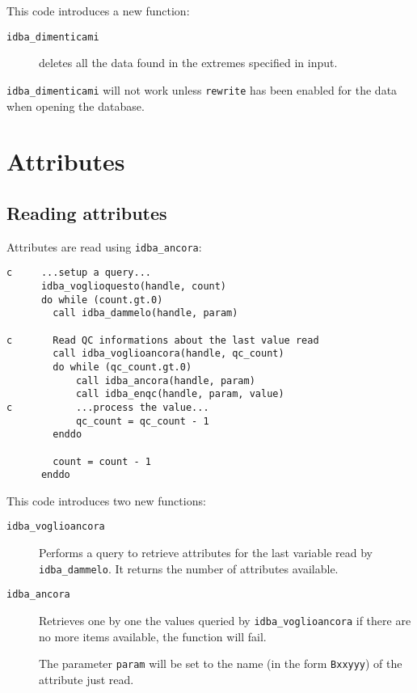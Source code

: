 \documentclass[final,12pt,a4paper,twoside]{book}
\begin{document}
This code introduces a new function:

\begin{description}
\item[{\tt idba\_dimenticami}]
  deletes all the data found in the extremes specified in input.
\end{description}

{\tt idba\_dimenticami} will not work unless {\tt rewrite} has been enabled for
the data when opening the database.

\section {Attributes}

\subsection{Reading attributes}

Attributes are read using {\tt idba\_ancora}:
\label{fun-idba_voglioancora}
\label{fun-idba_ancora}

\begin{verbatim}
c     ...setup a query...
      idba_voglioquesto(handle, count)
      do while (count.gt.0)
        call idba_dammelo(handle, param)

c       Read QC informations about the last value read
        call idba_voglioancora(handle, qc_count)
        do while (qc_count.gt.0)
            call idba_ancora(handle, param) 
            call idba_enqc(handle, param, value)
c           ...process the value...
            qc_count = qc_count - 1
        enddo

        count = count - 1
      enddo
\end{verbatim}

This code introduces two new functions:

\begin{description}
\item[{\tt idba\_voglioancora}]
  Performs a query to retrieve attributes for the last variable read by
  {\tt idba\_dammelo}.  It returns the number of attributes available.
\item[{\tt idba\_ancora}]
  Retrieves one by one the values queried by {\tt idba\_voglioancora} if
  there are no more items available, the function will fail.

  The parameter {\tt param} will be set to the name (in the form {\tt *Bxxyyy}) of
  the attribute just read.
\end{description}
\end{document}
